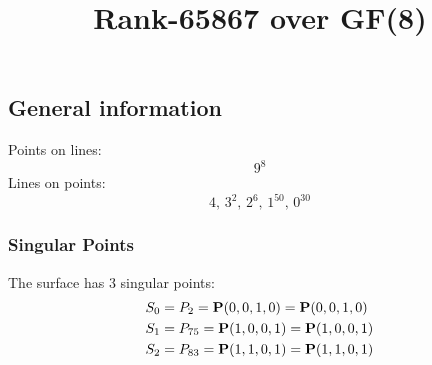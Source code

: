 \documentclass{article}
\newcommand\setTBstruts{\def\T{\rule{0pt}{2.6ex}}%
\def\B{\rule[-1.2ex]{0pt}{0pt}}}
\newcommand{\bP}{{\bf P}}
\begin{document}
 
\setTBstruts



{\allowdisplaybreaks%






\title{Rank-65867 over GF(8)}
\author{}%
\maketitle%
%
{}



\subsection*{General information}
Points on lines:
$$
9^8$$
Lines on points:
$$
4,\,3^2,\,2^6,\,1^{50},\,0^{30}$$
\subsubsection*{Singular Points}
The surface has 3 singular points:\\
\begin{align*}
S_{0} &= P_{2}=\bP(0, 0, 1, 0) = \bP(0, 0, 1, 0)\\
S_{1} &= P_{75}=\bP(1, 0, 0, 1) = \bP(1, 0, 0, 1)\\
S_{2} &= P_{83}=\bP(1, 1, 0, 1) = \bP(1, 1, 0, 1)\\
\end{align*}
}
\end{document}
